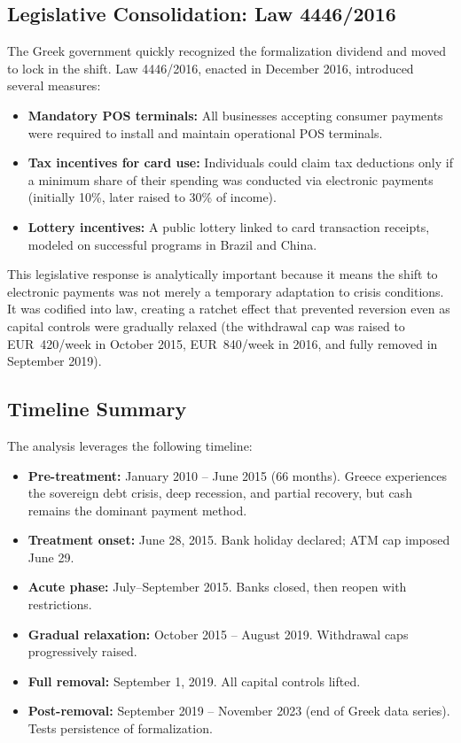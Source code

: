 \documentclass[12pt]{article}
\begin{document}
\subsection{Legislative Consolidation: Law 4446/2016}

The Greek government quickly recognized the formalization dividend and moved to lock in the shift. Law 4446/2016, enacted in December 2016, introduced several measures:

\begin{itemize}
    \item \textbf{Mandatory POS terminals:} All businesses accepting consumer payments were required to install and maintain operational POS terminals.
    \item \textbf{Tax incentives for card use:} Individuals could claim tax deductions only if a minimum share of their spending was conducted via electronic payments (initially 10\%, later raised to 30\% of income).
    \item \textbf{Lottery incentives:} A public lottery linked to card transaction receipts, modeled on successful programs in Brazil and China.
\end{itemize}

This legislative response is analytically important because it means the shift to electronic payments was not merely a temporary adaptation to crisis conditions. It was codified into law, creating a ratchet effect that prevented reversion even as capital controls were gradually relaxed (the withdrawal cap was raised to EUR~420/week in October 2015, EUR~840/week in 2016, and fully removed in September 2019).

\subsection{Timeline Summary}

The analysis leverages the following timeline:
\begin{itemize}
    \item \textbf{Pre-treatment:} January 2010 -- June 2015 (66 months). Greece experiences the sovereign debt crisis, deep recession, and partial recovery, but cash remains the dominant payment method.
    \item \textbf{Treatment onset:} June 28, 2015. Bank holiday declared; ATM cap imposed June 29.
    \item \textbf{Acute phase:} July--September 2015. Banks closed, then reopen with restrictions.
    \item \textbf{Gradual relaxation:} October 2015 -- August 2019. Withdrawal caps progressively raised.
    \item \textbf{Full removal:} September 1, 2019. All capital controls lifted.
    \item \textbf{Post-removal:} September 2019 -- November 2023 (end of Greek data series). Tests persistence of formalization.
\end{itemize}
\end{document}
